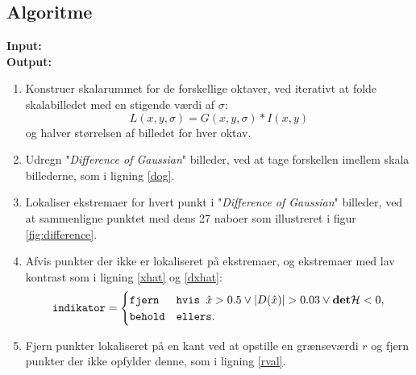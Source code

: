 \subsection{Algoritme}
\textbf{Input:} \\
\textbf{Output:}
\begin{enumerate}
\item{Konstruer skalarummet for de forskellige oktaver, ved iterativt at folde skalabilledet med en stigende værdi af $\sigma$: $$ L(x,y,\sigma)= G(x,y,\sigma) \ast I(x,y) $$
og halver størrelsen af billedet for hver oktav.}
\item{Udregn "\textit{Difference of Gaussian}" billeder, ved at tage forskellen imellem skala billederne, som i ligning \eqref{dog}.}
\item{Lokaliser ekstremaer for hvert punkt i "\textit{Difference of Gaussian}" billeder, ved at sammenligne punktet med dens 27 naboer som illustreret i figur \ref{fig:difference}.}

\item{Afvis punkter der ikke er lokaliseret på ekstremaer, og ekstremaer med lav kontrast som i ligning \eqref{xhat} og \eqref{dxhat}:
\begin{equation}
\begin{split}
\texttt{indikator} = 
\begin{cases}
\texttt{fjern}& \texttt{hvis } \hat{x}>0.5 \lor |D(\hat{x})|>0.03 \lor \bold{det} \mathcal{H}<0 , \\
\texttt{behold}& \texttt{ellers}. 
\end{cases}
\end{split}
\label{maxsurp}
\end{equation}
}
\item{Fjern punkter lokaliseret på en kant ved at opstille en grænseværdi $r$ og fjern punkter der ikke opfylder denne, som i ligning \eqref{rval}.}
\end{enumerate}